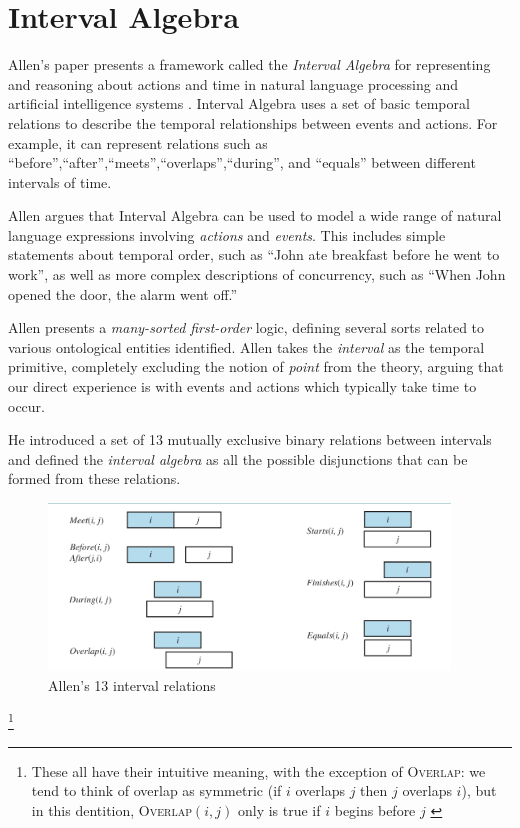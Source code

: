 \section{Interval Algebra}

Allen's paper presents a framework called the \textit{Interval Algebra} for representing and reasoning about actions and time in natural language processing and artificial intelligence systems \cite{allen1984towards}. Interval Algebra uses a set of basic temporal relations to describe the temporal relationships between events and actions. For example, it can represent relations such as ``before'',``after'',``meets'',``overlaps'',``during'', and ``equals'' between different intervals of time.

Allen argues that Interval Algebra can be used to model a wide range of natural language expressions involving \textit{actions} and \textit{events}. This includes simple statements about temporal order, such as ``John ate breakfast before he went to work'', as well as more complex descriptions of concurrency, such as ``When John opened the door, the alarm went off.''

Allen presents a \textit{many-sorted} \textit{first-order} logic, defining several sorts related to various ontological entities identified.
Allen takes the \textit{interval} as the temporal primitive, completely excluding the notion of \textit{point} from the theory, arguing that our direct experience
is with events and actions which typically take time to occur.

He introduced a set of 13 mutually exclusive binary relations between intervals and
defined the \textit{interval algebra} as all the possible disjunctions that can be formed from these relations.

\begin{figure}[H]
	\begin{center}
		\includegraphics[width=0.95\textwidth]{images/allen-13-interval-logic.png}
	\end{center}
	\caption{Allen's 13 interval relations}
	\label{fig: allen-13-interval-logic}
\end{figure}\footnote{These all have their intuitive meaning, with the exception of \textsc{Overlap}: we tend to think of
	overlap as symmetric (if $i$ overlaps $j$ then $j$ overlaps $i$), but in this dentition, \textsc{Overlap}$(i, j)$
	only is true if $i$ begins before $j$ \cite{russell2016artificial}
}



